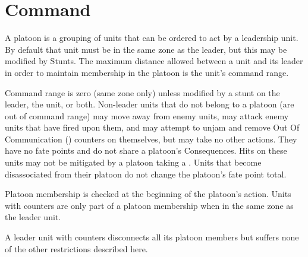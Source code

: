 \section{Command}\label{sec:Command}

A platoon is a grouping of units that can be ordered to act by a leadership unit. By default that unit must be in the same zone as the leader, but this may be modified by Stunts. The maximum distance allowed between a unit and its leader in order to maintain membership in the platoon is the unit's command range.


Command range is zero (same zone only) unless modified by a stunt on the leader, the unit, or both. Non-leader units that do not belong to a platoon (are out of command range) may move away from enemy units, may attack enemy units that have fired upon them, and may attempt to unjam and remove Out Of Communication (\OOC) counters on themselves, but may take no other actions. They have no fate points and do not share a platoon's Consequences. Hits on these units may not be mitigated by a platoon taking a \Consequence. Units that become disassociated from their platoon do not change the platoon's fate point total.

Platoon membership is checked at the beginning of the platoon's action. Units with \OOC{} counters are only part of a platoon membership when in the same zone as the leader unit.

A leader unit with \OOC{} counters disconnects all its platoon members but suffers none of the other restrictions described here.

